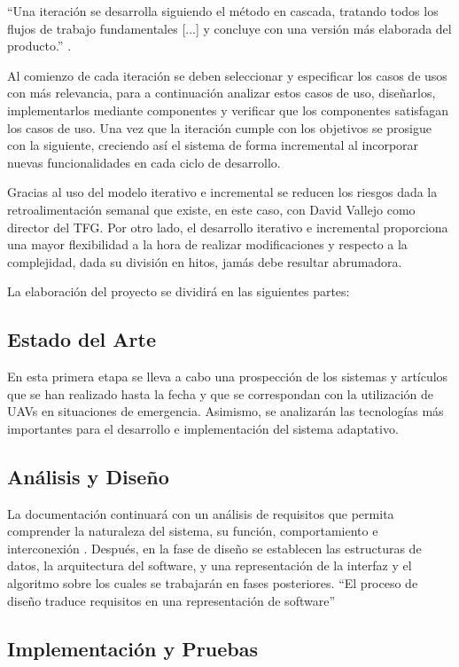 \documentclass{pre-tfg}
\begin{document}
``Una iteración se desarrolla siguiendo el método en cascada, tratando todos los flujos de trabajo fundamentales [...] y concluye con una versión más elaborada del producto.'' \cite{ingsoftware}.

Al comienzo de cada iteración se deben seleccionar y especificar los casos de usos con más relevancia, para a continuación analizar estos casos de uso, diseñarlos, implementarlos mediante componentes y verificar que los componentes satisfagan los casos de uso. Una vez que la iteración cumple con los objetivos se prosigue con la siguiente, creciendo así el sistema de forma incremental al incorporar nuevas funcionalidades en cada ciclo de desarrollo.   

Gracias al uso del modelo iterativo e incremental se reducen los riesgos dada la retroalimentación semanal que existe, en este caso, con David Vallejo como director del TFG. Por otro lado, el desarrollo iterativo e incremental proporciona una mayor flexibilidad a la hora de realizar modificaciones y respecto a la complejidad, dada su división en hitos, jamás debe resultar abrumadora.

La elaboración del proyecto se dividirá en las siguientes partes:

\subsection{Estado del Arte}

En esta primera etapa se lleva a cabo una prospección de los sistemas y artículos que se han realizado hasta la fecha y que se correspondan con la utilización de UAVs en situaciones de emergencia. Asimismo, se analizarán  las tecnologías más importantes para el desarrollo e implementación del sistema adaptativo.

\subsection{Análisis y Diseño}

La documentación continuará con un análisis de requisitos que permita comprender la naturaleza del sistema, su función, comportamiento e interconexión \cite{pressman}. Después, en la fase de diseño se establecen las estructuras de datos, la arquitectura del software, y una representación de la interfaz y el algoritmo sobre los cuales se trabajarán en fases posteriores. ``El proceso de diseño traduce requisitos en una representación de software'' \cite{pressman}

\subsection{Implementación y Pruebas}
\end{document}
